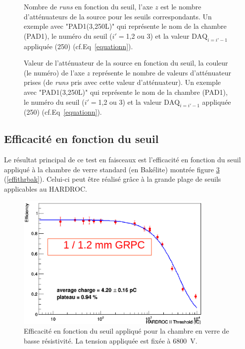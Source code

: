 \begin{figure}[ht!]
	\centering
	\caption{Nombre de \textit{runs} en fonction du seuil, l'axe $z$ est le nombre d'atténuateurs de la source pour les seuils correspondants. Un exemple avec "PAD1(3,250L)" qui représente le nom de la chambre (PAD1), le numéro du seuil ($i'=$1,2 ou 3) et la valeur $\mbox{DAQ}_{i=i'-1}$ appliquée (250) (cf.Eq~\ref{equationn}).}
	\label{elogutil3}	
\end{figure}

\begin{figure}[ht!]
	\centering
	\caption{Valeur de l'atténuateur de la source en fonction du seuil, la couleur (le numéro) de l'axe $z$ représente le nombre de valeurs d'atténuateur prises (de \textit{runs} pris avec cette valeur d'atténuateur). Un exemple avec "PAD1(3,250L)" qui représente le nom de la chambre (PAD1), le numéro du seuil ($i'=$1,2 ou 3) et la valeur $\mbox{DAQ}_{i=i'-1}$ appliquée (250) (cf.Eq~\ref{equationn}).}
	\label{elogutil4}	
\end{figure}

\subsection{Efficacité en fonction du seuil}
Le résultat principal de ce test en faisceaux est l'efficacité en fonction du seuil appliqué à la chambre de verre standard (en Bakélite) montrée figure \ref{effithrchi} (\ref{effithrbak}). Celui-ci peut être réalisé grâce à la grande plage de seuils applicables au HARDROC.

\begin{figure}[ht!]
	\centering
	\includegraphics[width=0.85\textwidth]{GLA/effithrchi.png}
	\captionsetup{type=figure}\caption{Efficacité en fonction du seuil appliqué pour la chambre en verre de basse résistivité. La tension appliquée est fixée à \SI{6800}{\volt}.}
	\label{effithrchi}
\end{figure}

